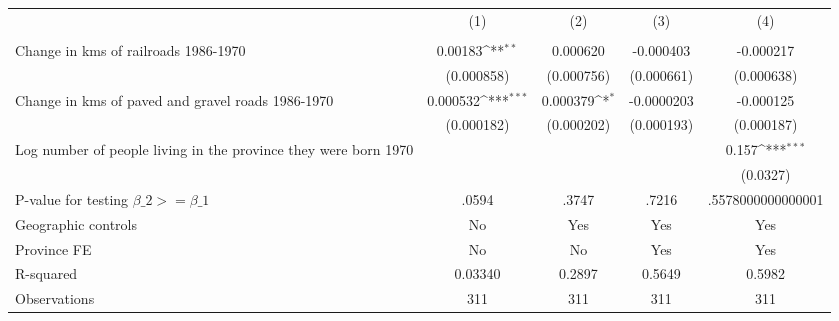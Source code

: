 {
\def\sym#1{\ifmmode^{#1}\else\(^{#1}\)\fi}
\begin{tabular}{l*{4}{c}}
\hline\hline
                &\multicolumn{1}{c}{(1)}&\multicolumn{1}{c}{(2)}&\multicolumn{1}{c}{(3)}&\multicolumn{1}{c}{(4)}\\
                &\multicolumn{1}{c}{}&\multicolumn{1}{c}{}&\multicolumn{1}{c}{}&\multicolumn{1}{c}{}\\
\hline
Change in kms of railroads 1986-1970&  0.00183\sym{**} & 0.000620         &-0.000403         &-0.000217         \\
                &(0.000858)         &(0.000756)         &(0.000661)         &(0.000638)         \\
[1em]
Change in kms of paved and gravel roads 1986-1970& 0.000532\sym{***}& 0.000379\sym{*}  &-0.0000203         &-0.000125         \\
                &(0.000182)         &(0.000202)         &(0.000193)         &(0.000187)         \\
[1em]
Log number of people living in the province they were born 1970&                  &                  &                  &    0.157\sym{***}\\
                &                  &                  &                  & (0.0327)         \\
\hline
P-value for testing $\beta\_{2} >= \beta\_{1}$&    .0594         &    .3747         &    .7216         &.5578000000000001         \\
Geographic controls&       No         &      Yes         &      Yes         &      Yes         \\
Province FE     &       No         &       No         &      Yes         &      Yes         \\
R-squared       &  0.03340         &   0.2897         &   0.5649         &   0.5982         \\
Observations    &      311         &      311         &      311         &      311         \\
\hline\hline
\end{tabular}
}
